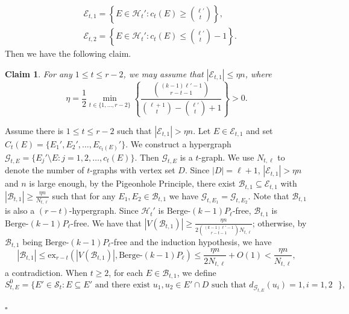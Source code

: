 \documentclass[12pt]{article}%
\newtheorem{claim}[theorem]{Claim}
\newenvironment{proof}{{\noindent\it Proof.}}{\hfill $\square$\par}
\newcommand{\ber}{\text{Berge-}}
\newcommand{\mh}{\mathcal{H}}
\newcommand{\mg}{\mathcal{G}}
\begin{document}
\begin{proof}
\begin{equation*}
\begin{aligned}
             &\mathcal{E}_{t,1}=\left\{E\in \mh_t' : c_t(E)\geq \binom{\ell'}{t}\right\},\\
             &\mathcal{E}_{t,2}=\left\{E\in \mh_t' : c_t(E)\leq \binom{\ell'}{t}-1\right\}.
         \end{aligned}
     \end{equation*}
     Then we have the following  claim.
     \begin{claim}\label{claim: et1 is small}
        For any $1\le t\le r-2$,  we may assume that $|\mathcal{E}_{t,1}|\leq \eta n$, where  $$ \eta=\frac{1}{2}\min_{t\in\{1,\ldots,r-2\}}\left\{\frac{\binom{(k-1)\ell'-1}{r-t-1}}{\binom{\ell+1}{t}-\binom{\ell'}{t}+1}\right\} >0.$$
     \end{claim}


    Assume there is $1\le t\le r-2$ such that
 $|\mathcal{E}_{t,1}|>\eta n$. Let
  $E\in \mathcal{E}_{t,1}$ and set $C_t(E)=\{E_{1}',E_{2}',\ldots,E_{c_t(E)}'\}$.
   We construct a hypergraph $\mg_{t,E}=\{E_{j}'\setminus E : j=1,2,\ldots,c_t(E)\}$. Then $\mg_{t,E}$ is a $t$-graph. We use $N_{t,\ell}$ to denote the number of
   $t$-graphs with vertex set $D$. Since $|D|=\ell+1$, $|\mathcal{E}_{t,1}|>\eta n$ and $n$ is large enough, by the Pigeonhole Principle,  there exist $\mathcal{B}_{t,1}\subseteq \mathcal{E}_{t,1}$ with $|\mathcal{B}_{t,1}|\geq \frac{\eta n}{N_{t,\ell}}$ such that for any $E_1,E_2\in\mathcal{B}_{t,1}$ we have $\mg_{t,E_1}=\mg_{t,E_2}$. Note that $\mathcal{B}_{t,1}$ is also a $(r-t)$-hypergraph. Since  $\mh_t'$ is $\ber (k-1)P_{\ell}$-free, $\mathcal{B}_{t,1}$ is $\ber (k-1)P_{\ell}$-free. We have that $|V(\mathcal{B}_{t,1})|\ge
     \frac{\eta n}{2 \binom{(k-1)\ell'-1}{r-t-1}N_{t,\ell}}$; otherwise, by $\mathcal{B}_{t,1}$ being $\ber (k-1)P_{\ell}$-free and  the induction hypothesis, we have
     $$|\mathcal{B}_{t,1}|\leq \mathrm{ex}_{r-t}(|V(\mathcal{B}_{t,1})|,\ber (k-1)P_{\ell})\leq \frac{\eta n}{2 N_{t,\ell}}+O(1)<\frac{\eta n}{N_{t,\ell}},$$
      a contradiction.
      When $t\geq 2$, for each $E\in \mathcal{B}_{t,1}$, we define
     $$S_{t,E}^{0}=\{E'\in \mathcal{S}_{t} : \text{$E\subseteq E'$ and there exist $u_1,u_2\in E'\cap D$ such that $d_{\mg_{t,E}}(u_i)=1,i=1,2$ } \},$$

\end{proof}
\end{document}
